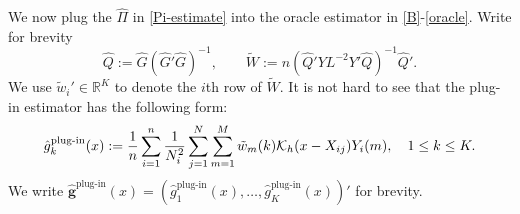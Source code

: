 \documentclass[preprint,11pt]{article}
\numberwithin{equation}{section}
\newcommand{\beq}{\begin{equation}}
\newcommand{\eeq}{\end{equation}}
\begin{document}



We now plug the $\widehat{\Pi}$ in \eqref{Pi-estimate} into the oracle estimator in \eqref{B}-\eqref{oracle}. Write for brevity
\beq \label{def-hat-Q}
\widehat{Q}:=  \widehat{G}(\widehat{G}'\widehat{G})^{-1},\qquad \widetilde{W}:=  n (\widehat{Q}'YL^{-2} Y'\widehat{Q})^{-1} \widehat{Q}'.
\eeq
We use $\tilde{w}_i'\in\mathbb{R}^K$ to denote the $i$th row of $\widetilde{W}$. 
It is not hard to see that the plug-in estimator has the following form:  
\beq \label{naiveEstimate}
\hat{g}_k^{\text{plug-in}}(x):= \frac{1}{n}\sum_{i=1}^n \frac{1}{N_i^2}\sum_{j=1}^N \sum_{m=1}^M \tilde{w}_{m}(k) {\cal K}_h(x-X_{ij})Y_{i}(m),\quad 1\leq k\leq K.
\eeq
We write $\widehat{\boldsymbol g}^{\text{plug-in}}(x)=(\hat{g}^{\text{plug-in}}_1(x),\ldots, \hat{g}^{\text{plug-in}}_K(x))'$ for brevity. 
\end{document}
